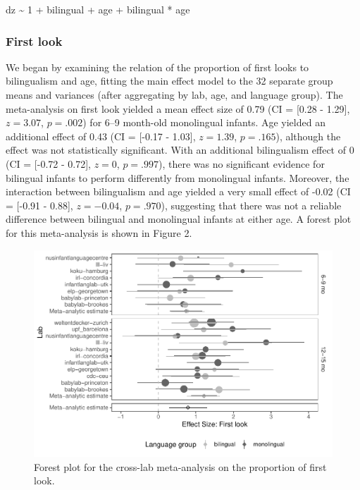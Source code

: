\documentclass[,man,floatsintext]{apa6}
\begin{document}
dz \textasciitilde{} 1 + bilingual + age + bilingual * age

\hypertarget{first-look-1}{%
\subsubsection{First look}\label{first-look-1}}

We began by examining the relation of the proportion of first looks to bilingualism and age, fitting the main effect model to the 32 separate group means and variances (after aggregating by lab, age, and language group). The meta-analysis on first look yielded a mean effect size of 0.79 (CI = {[}0.28 - 1.29{]}, \(z = 3.07\), \(p = .002\)) for 6--9 month-old monolingual infants. Age yielded an additional effect of 0.43 (CI = {[}-0.17 - 1.03{]}, \(z = 1.39\), \(p = .165\)), although the effect was not statistically significant. With an additional bilingualism effect of 0 (CI = {[}-0.72 - 0.72{]}, \(z = 0\), \(p = .997\)), there was no significant evidence for bilingual infants to perform differently from monolingual infants. Moreover, the interaction between bilingualism and age yielded a very small effect of -0.02 (CI = {[}-0.91 - 0.88{]}, \(z = -0.04\), \(p = .970\)), suggesting that there was not a reliable difference between bilingual and monolingual infants at either age. A forest plot for this meta-analysis is shown in Figure 2.

\begin{figure}
\centering
\includegraphics{gaze-following-paper_files/figure-latex/fig2-1.pdf}
\caption{\label{fig:fig2}Forest plot for the cross-lab meta-analysis on the proportion of first look.}
\end{figure}
\end{document}
